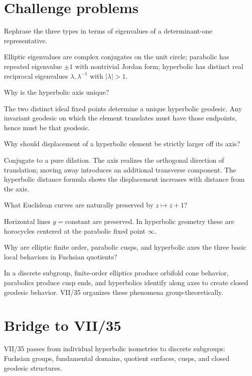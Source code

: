 \section{Challenge problems}
\begin{problem}\label{prob:vii34-ch01}
Rephrase the three types in terms of eigenvalues of a determinant-one representative.
\end{problem}
\begin{solution}
Elliptic eigenvalues are complex conjugates on the unit circle; parabolic has repeated eigenvalue \(\pm1\) with nontrivial Jordan form; hyperbolic has distinct real reciprocal eigenvalues \(\lambda,\lambda^{-1}\) with \(|\lambda|>1\).
\end{solution}

\begin{problem}\label{prob:vii34-ch02}
Why is the hyperbolic axis unique?
\end{problem}
\begin{solution}
The two distinct ideal fixed points determine a unique hyperbolic geodesic. Any invariant geodesic on which the element translates must have those endpoints, hence must be that geodesic.
\end{solution}

\begin{problem}\label{prob:vii34-ch03}
Why should displacement of a hyperbolic element be strictly larger off its axis?
\end{problem}
\begin{solution}
Conjugate to a pure dilation. The axis realizes the orthogonal direction of translation; moving away introduces an additional transverse component. The hyperbolic distance formula shows the displacement increases with distance from the axis.
\end{solution}

\begin{problem}\label{prob:vii34-ch04}
What Euclidean curves are naturally preserved by \(z\mapsto z+1\)?
\end{problem}
\begin{solution}
Horizontal lines \(y=\text{constant}\) are preserved. In hyperbolic geometry these are horocycles centered at the parabolic fixed point \(\infty\).
\end{solution}

\begin{problem}\label{prob:vii34-ch05}
Why are elliptic finite order, parabolic cusps, and hyperbolic axes the three basic local behaviors in Fuchsian quotients?
\end{problem}
\begin{solution}
In a discrete subgroup, finite-order elliptics produce orbifold cone behavior, parabolics produce cusp ends, and hyperbolics identify along axes to create closed geodesic behavior. VII/35 organizes these phenomena group-theoretically.
\end{solution}

\section*{Bridge to VII/35}
VII/35 passes from individual hyperbolic isometries to discrete subgroups: Fuchsian groups, fundamental domains, quotient surfaces, cusps, and closed geodesic structures.
